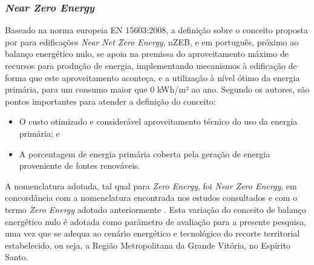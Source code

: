 \subsubsection{\textit{Near Zero Energy}}
 Baseado na norma europeia EN 15603:2008, a definição sobre o conceito proposta por
 \textcite{Kurnitski2011a} para edificações \textit{Near Net Zero Energy}, nZEB, e 
 em português, próximo ao balanço energético nulo, se apoia na premissa do aproveitamento 
 máximo de recursos para produção de energia, implementando mecanismos à edificação 
 de forma que este aproveitamento aconteça, e a utilização à nível ótimo da energia 
 primária, para um consumo maior que 0 kWh/m² ao ano. Segundo os autores, são pontos 
 importantes para atender a definição do conceito:
    \begin{itemize}
        \item O custo otimizado e considerável aproveitamento técnico do uso da energia primária; e
        \item A porcentagem de energia primária coberta pela geração de energia proveniente de 
        fontes renováveis.
    \end{itemize}
A nomenclatura adotada, tal qual para \textit{Zero Energy}, foi \textit{Near Zero Energy}, 
em concordância com a nomenclatura encontrada nos estudos consultados e com o termo 
\textit{Zero Energy} adotado anteriormente \cite{AmericanSocietyofHeatingRefrigeratingandAir-ConditioningEngineers-ASHRAE2019}.
Esta variação do conceito de balanço energético nulo é adotada como parâmetro de avaliação 
para a presente pesquisa, uma vez que se adequa ao cenário energético e tecnológico do 
recorte territorial estabelecido, ou seja, a Região Metropolitana da Grande Vitória, no 
Espírito Santo.

